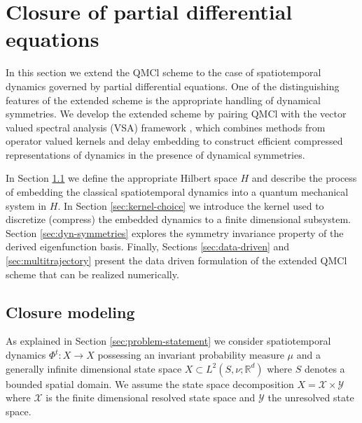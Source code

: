 \documentclass[letterpaper,10pt,3p,preprint]{elsarticle}
\newcommand{\Rbb}{\mathbb{R}}
\newcommand{\Xcal}{\mathcal{X}}
\newcommand{\Ycal}{\mathcal{Y}}
\begin{document}
\section{Closure of partial differential equations}\label{sec:qmcl-pdes}
In this section we extend the QMCl scheme to the case of
spatiotemporal dynamics governed by partial differential equations.
One of the distinguishing features of the extended scheme is the
appropriate handling of dynamical symmetries.
We develop the extended scheme by pairing QMCl with the
vector valued spectral analysis (VSA) framework
\cite{Giannakis2019vsa},
which combines methods from operator valued kernels and
delay embedding to construct efficient compressed representations
of dynamics in the presence of dynamical symmetries.

In Section \ref{sec:qmcl-pdes-closure}
we define the appropriate Hilbert space $H$ and
describe the process of embedding the classical spatiotemporal
dynamics into a quantum mechanical system in $H$.
In Section \ref{sec:kernel-choice}
we introduce the kernel used to discretize (compress)
the embedded dynamics to a finite dimensional subsystem.
Section \ref{sec:dyn-symmetries}
explores the symmetry invariance property of the derived
eigenfunction basis.
Finally, Sections \ref{sec:data-driven} and \ref{sec:multitrajectory}
present the data driven formulation of the extended QMCl scheme
that can be realized numerically.

\subsection{Closure modeling}\label{sec:qmcl-pdes-closure}
As explained in Section \ref{sec:problem-statement}
we consider spatiotemporal dynamics
$\Phi^t\colon X\rightarrow X$
possessing an invariant probability measure $\mu$
and a generally infinite dimensional state space
$X\subset L^2(S,\nu;\Rbb^d)$
where $S$ denotes a bounded spatial domain.
We assume the state space decomposition $X=\Xcal\times\Ycal$
where $\Xcal$ is the finite dimensional resolved state space
and $\Ycal$ the unresolved state space.
\end{document}

